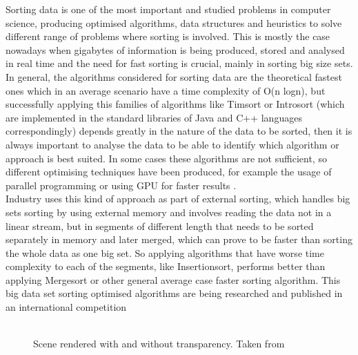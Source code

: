 \documentclass[a4paper,12pt]{article}
\begin{document}
Sorting data is one of the most important and studied problems in computer science, producing optimised algorithms, data structures and heuristics to solve different range of problems where sorting is involved. This is mostly the case nowadays when gigabytes of information is being produced, stored and analysed in real time and the need for fast sorting is crucial, mainly in sorting big size sets. In general, the algorithms considered for sorting data are the theoretical fastest ones which in an average scenario have a time complexity of O(n logn), but successfully applying this families of algorithms like Timsort\cite{Timsort} or Introsort\cite{musser1997introspective} (which are implemented in the standard libraries of Java and C++ languages correspondingly) depends greatly in the nature of the data to be sorted, then it is always important to analyse the data to be able to identify which algorithm or approach is best suited. In some cases these algorithms are not sufficient, so different optimising techniques have been produced, for example the usage of parallel programming or using GPU for faster results \cite{satish2009designing}. \\ 

Industry uses this kind of approach as part of external sorting,  which handles big sets sorting by using external memory and involves reading the data not in a linear stream, but in segments of different length that needs to be sorted separately in memory and later merged, which can prove to be faster than sorting the whole data as one big set. So applying algorithms that have worse time complexity to each of the segments, like Insertionsort, performs better than applying Mergesort or other general average case faster sorting algorithm. This big data set sorting optimised algorithms are being researched and published in an international competition \cite{SortBenchmark} \\
\\

\begin{figure}[H]
\centering
{}
\hfill %
\caption{Scene rendered with and without transparency. Taken from \cite{Arch2015}}
\label{fig:Transp}
\end{figure}
\end{document}
